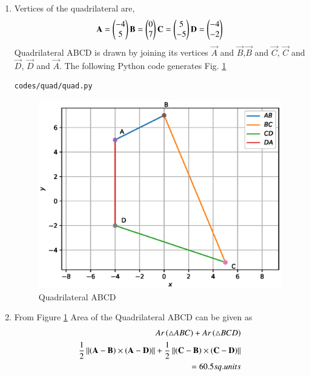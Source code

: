 \renewcommand{\theequation}{\theenumi}
\begin{enumerate}[label=\thesection.\arabic*.,ref=\thesection.\theenumi]

\item Vertices of the quadrilateral are,
\begin{align}
\mathbf{A}=\begin{pmatrix}-4\\5\end{pmatrix}
\mathbf{B}=\begin{pmatrix}0\\7\end{pmatrix}
\mathbf{C}=\begin{pmatrix}5\\-5\end{pmatrix}
\mathbf{D}=\begin{pmatrix}-4\\-2\end{pmatrix}
\end{align}
Quadrilateral ABCD is drawn by joining its vertices $\vec{A}$ and $\vec{B}$,$\vec{B}$ and $\vec{C}$, $\vec{C}$ and $\vec{D}$, $\vec{D}$ and $\vec{A}$.
 The  following Python code generates Fig. \ref{fig:quad_py}
%
\begin{lstlisting}
codes/quad/quad.py
\end{lstlisting}
\begin{figure}[!ht]
\centering
\includegraphics[width=\columnwidth]{./codes/quad/pyfigs/quad.eps}
\caption{Quadrilateral ABCD}
\label{fig:quad_py}
\end{figure}

\item From Figure \ref{fig:quad_py} Area of the Quadrilateral ABCD can be given as
\begin{align}
Ar\left(\triangle ABC\right) + Ar\left(\triangle BCD\right)
\\
\frac{1}{2} \left\lVert\left(\mathbf{A}-\mathbf{B}\right)\times \left(\mathbf{A}-\mathbf{D}\right)\right\rVert + \frac{1}{2} \left\lVert{\ensuremath{\left(\mathbf{C}-\mathbf{B}\right)}} \times{\ensuremath{\left(\mathbf{C}-\mathbf{D}\right)}}\right\rVert
\\
=60.5 sq.units
\end{align}
\end{enumerate}
